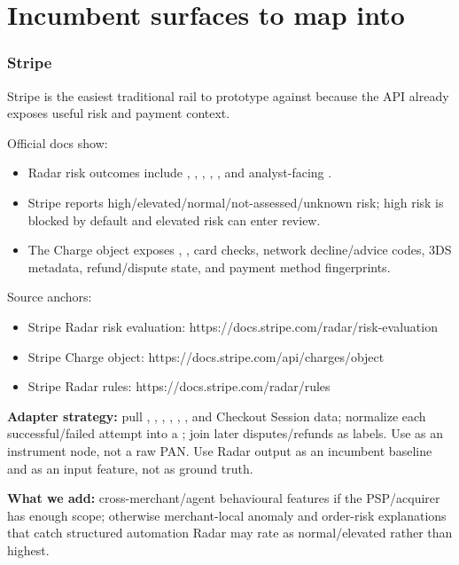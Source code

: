 \documentclass[11pt]{article}
\begin{document}
\section{Incumbent surfaces to map into}
\subsubsection*{Stripe}
Stripe is the easiest traditional rail to prototype against because the API already exposes useful risk and payment context.

Official docs show:

\begin{itemize}
  \item Radar risk outcomes include , , , , , and analyst-facing .
  \item Stripe reports high/elevated/normal/not-assessed/unknown risk; high risk is blocked by default and elevated risk can enter review.
  \item The Charge object exposes , , card checks, network decline/advice codes, 3DS metadata, refund/dispute state, and payment method fingerprints.
\end{itemize}
Source anchors:

\begin{itemize}
  \item Stripe Radar risk evaluation: https://docs.stripe.com/radar/risk-evaluation
  \item Stripe Charge object: https://docs.stripe.com/api/charges/object
  \item Stripe Radar rules: https://docs.stripe.com/radar/rules
\end{itemize}
\textbf{Adapter strategy:} pull , , , , , , and Checkout Session data; normalize each successful/failed attempt into a ; join later disputes/refunds as labels. Use  as an instrument node, not a raw PAN. Use Radar output as an incumbent baseline and as an input feature, not as ground truth.

\textbf{What we add:} cross-merchant/agent behavioural features if the PSP/acquirer has enough scope; otherwise merchant-local anomaly and order-risk explanations that catch structured automation Radar may rate as normal/elevated rather than highest.
\end{document}
